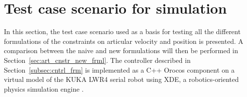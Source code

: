 \section{Test case scenario for simulation}
In this section, the test case scenario used as a basis for testing all the different formulations of the constraints on articular velocity and position is presented. A comparison between the naive and new formulations will then be performed in Section~\ref{sec:art_cnstr_new_frml}. The controller described in Section~\ref{subsec:cntrl_frm} is implemented as a C++ Orocos component \cite{rtt-url} on a virtual model of the KUKA LWR4 serial robot using XDE, a robotics-oriented physics simulation engine \cite{merlhiot2012}. 


